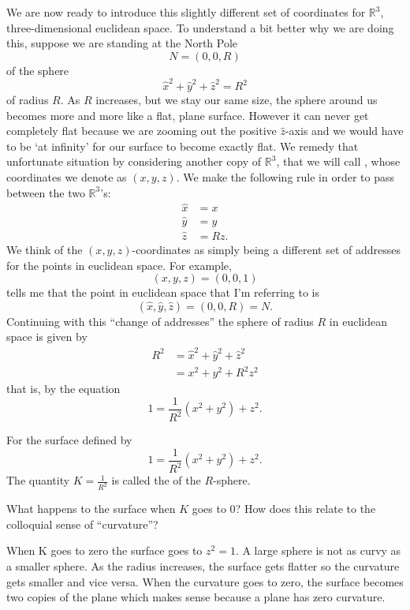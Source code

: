 \documentclass[newpage,hints,handout]{ximera}
\begin{document}
We are now ready to introduce this slightly different set of coordinates for
$\mathbb{R}^{3}$, three-dimensional euclidean space. To understand a bit better why we are doing this,
suppose we are standing at the North Pole%
\[
N=(0,0,R)
\]
of the sphere%
\[
\hat{x}^{2}+\hat{y}^{2}+\hat{z}^{2}=R^{2} %
\]
of radius $R$. As $R$ increases, but we stay our same size, the sphere
around us becomes more and more like a flat, plane surface. However it
can never get completely flat because we are zooming out the positive
$\hat{z}$-axis and we would have to be `at infinity' for our surface
to become exactly flat. We remedy that unfortunate situation by
considering another copy of $\mathbb{R}^{3}$, that we will call
, whose coordinates we denote as
$\left( x,y,z\right) $.  We make the following rule in order to pass
between the two $\mathbb{R}^{3}$'s:%
\begin{align*}
\hat{x}  &  =x\\
\hat{y}  &  =y\\
\hat{z}  &  =Rz.
\end{align*}
We think of the $\left( x,y,z\right) $-coordinates as simply being a
different set of addresses for the points in euclidean space. For
example,
\[
\left(x,y,z\right)  =\left(0,0,1\right)
\]
tells me that the point in euclidean space that I'm referring to is%
\[
\left(\hat{x},\hat{y},\hat{z}\right) =\left( 0,0,R\right)= N.
\]
Continuing with this ``change of addresses'' the sphere of radius $R$
in euclidean space is given by
\begin{align*}
R^{2} & =\hat{x}^{2}+\hat{y}^{2}+\hat{z}^{2}\\ &
=x^{2}+y^{2}+R^{2}z^{2}
\end{align*}
that is, by the equation
\[
1=\frac{1}{R^{2}}\left(  x^{2}+y^{2}\right)  +z^{2}. %
\]
\begin{definition}
  For the surface defined by
  \[
  1=\frac{1}{R^{2}}\left(  x^{2}+y^{2}\right)  +z^{2}. %
  \]
The quantity $K=\frac{1}{R^{2}}$ is called the  of the
$R$-sphere.
\end{definition}

\begin{problem}
  What happens to the surface when $K$ goes to $0$?  How does this relate to the
  colloquial sense of ``curvature''?
  
\begin{freeResponse}
When K goes to zero the surface goes to $z^{2} =1$.  A large sphere is not as curvy as a smaller sphere. As the radius increases, the surface gets flatter so the curvature gets smaller and vice versa.  When the curvature goes to zero, the surface becomes two copies of the plane which makes sense because a plane has zero curvature.  
\end{freeResponse}

\end{problem}
\end{document}
